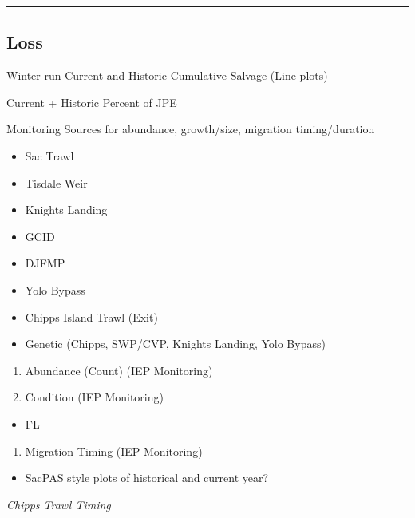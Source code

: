 \documentclass[
]{book}
\providecommand{\tightlist}{%
  \setlength{\itemsep}{0pt}\setlength{\parskip}{0pt}}
\theoremstyle{definition}
\theoremstyle{definition}
\theoremstyle{definition}
\theoremstyle{definition}
\theoremstyle{remark}
\begin{document}
\begin{center}\rule{0.5\linewidth}{0.5pt}\end{center}

\hypertarget{loss}{%
\subsection{Loss}\label{loss}}

Winter-run Current and Historic Cumulative Salvage (Line plots)

Current + Historic Percent of JPE

Monitoring Sources for abundance, growth/size, migration timing/duration

\begin{itemize}
\tightlist
\item
  Sac Trawl
\item
  Tisdale Weir
\item
  Knights Landing
\item
  GCID
\item
  DJFMP
\item
  Yolo Bypass
\item
  Chipps Island Trawl (Exit)
\item
  Genetic (Chipps, SWP/CVP, Knights Landing, Yolo Bypass)
\end{itemize}

\begin{enumerate}
\def\labelenumi{\arabic{enumi}.}
\item
  Abundance (Count) (IEP Monitoring)
\item
  Condition (IEP Monitoring)
\end{enumerate}

\begin{itemize}
\tightlist
\item
  FL
\end{itemize}

\begin{enumerate}
\def\labelenumi{\arabic{enumi}.}
\setcounter{enumi}{2}
\tightlist
\item
  Migration Timing (IEP Monitoring)
\end{enumerate}

\begin{itemize}
\tightlist
\item
  SacPAS style plots of historical and current year?
\end{itemize}

\emph{Chipps Trawl Timing}
\end{document}
